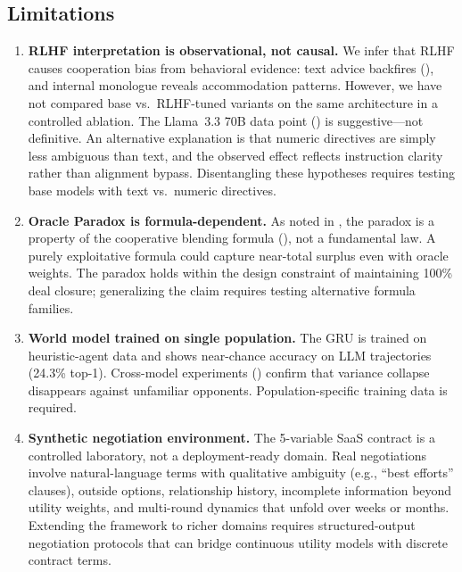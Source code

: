 \documentclass[11pt,a4paper]{article}
\begin{document}
\subsection{Limitations}
\label{sec:limitations}

\begin{enumerate}
\item \textbf{RLHF interpretation is observational, not causal.} We infer that RLHF causes cooperation bias from behavioral evidence: text advice backfires (), and internal monologue reveals accommodation patterns. However, we have not compared base vs.\ RLHF-tuned variants on the same architecture in a controlled ablation. The Llama~3.3 70B data point () is suggestive---not definitive. An alternative explanation is that numeric directives are simply less ambiguous than text, and the observed effect reflects instruction clarity rather than alignment bypass. Disentangling these hypotheses requires testing base models with text vs.\ numeric directives.

\item \textbf{Oracle Paradox is formula-dependent.} As noted in , the paradox is a property of the cooperative blending formula (), not a fundamental law. A purely exploitative formula could capture near-total surplus even with oracle weights. The paradox holds within the design constraint of maintaining 100\% deal closure; generalizing the claim requires testing alternative formula families.

\item \textbf{World model trained on single population.} The GRU is trained on heuristic-agent data and shows near-chance accuracy on LLM trajectories (24.3\% top-1). Cross-model experiments () confirm that variance collapse disappears against unfamiliar opponents. Population-specific training data is required.

\item \textbf{Synthetic negotiation environment.} The 5-variable SaaS contract is a controlled laboratory, not a deployment-ready domain. Real negotiations involve natural-language terms with qualitative ambiguity (e.g., ``best efforts'' clauses), outside options, relationship history, incomplete information beyond utility weights, and multi-round dynamics that unfold over weeks or months. Extending the framework to richer domains requires structured-output negotiation protocols that can bridge continuous utility models with discrete contract terms.


\end{enumerate}
\end{document}
